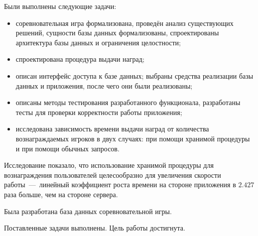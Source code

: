 
Были выполнены следующие задачи:
\begin{itemize}
	\item соревновательная игра формализована, проведён анализ существующих решений,
	сущности базы данных формализованы, спроектированы архитектура базы данных и ограничения целостности;
	\item спроектирована процедура выдачи наград;
	\item описан интерфейс доступа к базе данных; выбраны средства реализации базы данных и приложения, после чего они были реализованы;
	\item описаны методы тестирования разработанного функционала, разработаны тесты для проверки корректности работы приложения;
	\item исследована зависимость времени выдачи наград от количества вознаграждаемых игроков в двух случаях: при помощи хранимой процедуры и при помощи обычных запросов.
\end{itemize}

Исследование показало, что использование хранимой процедуры для вознаграждения пользователей целесообразно для увеличения скорости работы~---~линейный коэффициент роста времени на стороне приложения в $2.427$ раза больше, чем на стороне сервера.

Была разработана база данных соревновательной игры.

Поставленные задачи выполнены. Цель работы достигнута.